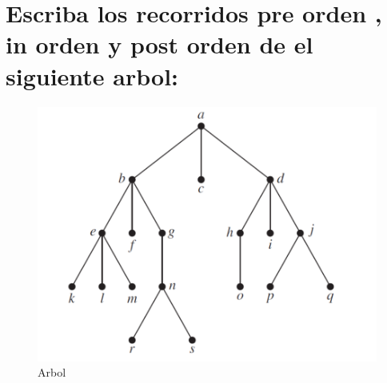 \documentclass[10pt,a4paper]{article} %
\begin{document}

    \newpage
    \section{Escriba los recorridos pre orden , in orden y post orden de el siguiente arbol:}
        \begin{figure}[h!]
            \centering
            \includegraphics[width=0.5\linewidth]{arbol.png}
            \caption{Arbol}
            \label{arbol}
        \end{figure}



































    \nocite{*}
    
    
\end{document}
